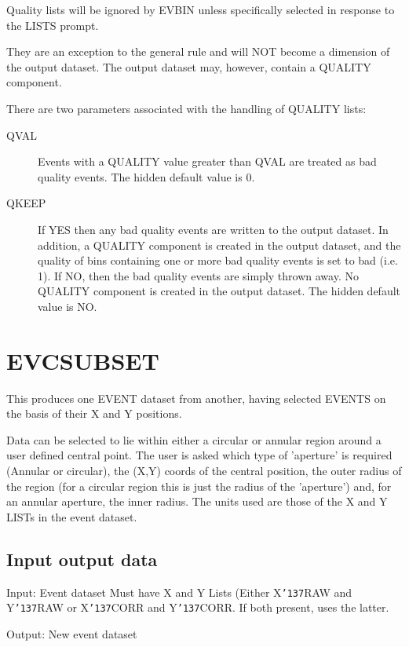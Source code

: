 \documentclass{book}
\renewcommand{\_}{{\tt\char'137}}     %
\begin{document}
Quality lists will be ignored by EVBIN unless specifically
selected in response to the LISTS prompt.

They are an exception to the general rule and will NOT become a
dimension of the output dataset. The output dataset may, however,
contain a QUALITY component.

There are two parameters associated with the handling of QUALITY
lists:

\begin{description}
\item[QVAL]
Events with a QUALITY value greater than QVAL are
treated as bad quality events. The hidden default
value is 0.
\item[QKEEP]
If YES then any bad quality events are written to the
output dataset. In addition, a QUALITY component is
created in the output dataset, and the quality of bins
containing one or more bad quality events is set to
bad (i.e. 1).
If NO, then the bad quality events are simply
thrown away. No QUALITY component is created in the
output dataset.
The hidden default value is NO.
\end{description}
\section{EVCSUBSET}
This produces one EVENT dataset from another, having selected
EVENTS on the basis of their X and Y positions.

Data can be selected to lie within either a circular or annular
region around a user defined central point. The user is asked
which type of 'aperture' is required (Annular or circular), the
(X,Y) coords of the central position, the outer radius of the
region (for a circular region this is just the radius of the
'aperture') and, for an annular aperture, the inner radius.
The units used are those of the X and Y LISTs in the event
dataset.

\subsection{Input output data}
Input: Event dataset
Must have X and Y Lists (Either X\_RAW and Y\_RAW or
X\_CORR and Y\_CORR. If both present, uses the latter.

Output: New event dataset
\end{document}
